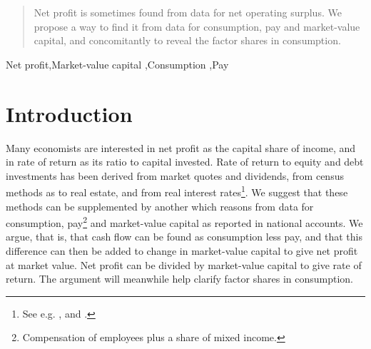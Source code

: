 
\begin{abstract}
Net profit is sometimes found from data for net operating surplus.  We propose a way to find it from data for consumption, pay and market-value capital, and concomitantly to reveal the factor shares in consumption.
\\
\end{abstract}



\begin{keywords}
Net profit\sep Market-value capital \sep Consumption \sep Pay
\end{keywords}

\maketitle

\section{Introduction}

Many economists are interested in net profit as the capital share of income, and in rate of return as its ratio to capital invested. 
%
Rate of return to equity and debt investments has been derived from market quotes and dividends, from census methods as to real estate, and from real interest rates\footnote{See e.g. \cite{jorda2019}, and \cite{homer2005history}.}. We suggest that these methods can be supplemented by another which reasons from data for consumption, pay\footnote{Compensation of employees plus a share of mixed income.} and market-value capital as reported in national accounts. We argue, that is,
%
that cash flow can be found as consumption less pay, and that this difference can then be added to change in market-value capital to give net profit at market value. Net profit can be divided by market-value capital to give rate of return. The argument will meanwhile help clarify factor shares in consumption.

